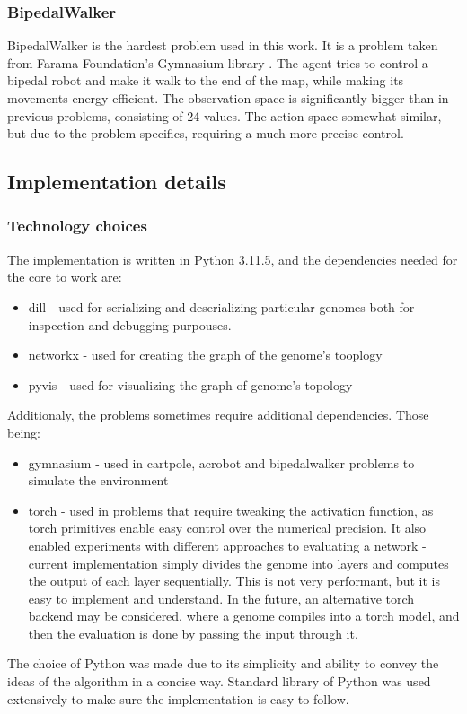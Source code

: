 \documentclass{article}
\begin{document}
        \subsubsection{BipedalWalker}
        BipedalWalker is the hardest problem used in this work. It is a problem taken from Farama Foundation's
        Gymnasium library \cite{gymnasium}. The agent tries to control a bipedal robot and make it walk to the end of the map, while
        making its movements energy-efficient. The observation space is significantly bigger than in previous problems,
        consisting of 24 values. The action space somewhat similar, but due to the problem specifics, requiring a 
        much more precise control. 
    \subsection{Implementation details}
        \subsubsection{Technology choices}
        The implementation is written in Python 3.11.5, and the dependencies needed for the core to work are:
        \begin{itemize}
            \item dill - used for serializing and deserializing particular genomes both for inspection and debugging purpouses. 
            \item networkx - used for creating the graph of the genome's tooplogy 
            \item pyvis - used for visualizing the graph of genome's topology
        \end{itemize}
        Additionaly, the problems sometimes require additional dependencies. Those being:
        \begin{itemize}
            \item gymnasium \cite{gymnasium} - used in cartpole, acrobot and bipedalwalker problems to simulate the environment
            \item torch \cite{Pytorch} - used in problems that require tweaking the activation function, as torch primitives enable easy control over the numerical precision. 
                It also enabled experiments with different approaches to evaluating a network - current implementation simply divides the genome into layers and 
                computes the output of each layer sequentially. This is not very performant, but it is easy to implement and understand. In the future,
                an alternative torch backend may be considered, where a genome compiles into a torch model, and then the evaluation is done by passing the input
                through it.
        \end{itemize}
        The choice of Python was made due to its simplicity and ability to convey the ideas of the algorithm in a concise way.
        Standard library of Python was used extensively to make sure the implementation is easy to follow.
\end{document}
